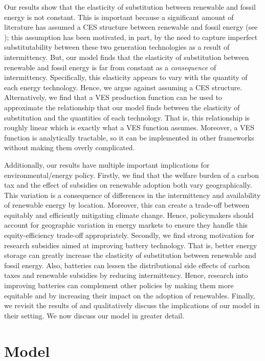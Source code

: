 \documentclass[11pt,a4paper,leqno]{extarticle}
\begin{document}
	Our results show that the elasticity of substitution between renewable and fossil energy is not constant. This is important because a significant amount of literature has assumed a CES structure between renewable and fossil energy (see \citet{Pap}); this assumption has been motivated, in part, by the need to capture imperfect substitutability between these two generation technologies as a result of intermittency. But, our model finds that the elasticity of substitution between renewable and fossil energy is far from constant as a \textit{consequence} of intermittency. Specifically, this elasticity appears to vary with the quantity of each energy technology. Hence, we argue against assuming a CES structure. Alternatively, we find that a VES production function can be used to approximate the relationship that our model finds between the elasticity of substitution and the quantities of each technology. That is, this relationship is roughly linear which is exactly what a VES function assumes. Moreover, a VES function is analytically tractable, so it can be implemented in other frameworks without making them overly complicated. 
	
	Additionally, our results have multiple important implications for environmental/energy policy. Firstly, we find that the welfare burden of a carbon tax  and the effect of subsidies on renewable adoption both vary geographically. This variation is a consequence of differences in the intermittency and availability of renewable energy by location. Moreover, this can create a trade-off between equitably and efficiently mitigating climate change. Hence, policymakers should account for geographic variation in energy markets to ensure they handle this equity-efficiency trade-off appropriately. Secondly, we find strong motivation for research subsidies aimed at improving battery technology. That is, better energy storage can greatly increase the elasticity of substitution between renewable and fossil energy.  Also, batteries can  lessen the distributional side effects of carbon taxes and renewable subsidies by  reducing intermittency. Hence, research into improving batteries can complement other policies by making them more equitable and by increasing their impact on the adoption of renewables. Finally, we revisit the results of \citet{Ace2012} and qualitatively discuss the implications of our model in their setting. We now discuss our model in greater detail.
	
	
	\section{Model}
	
\end{document}
